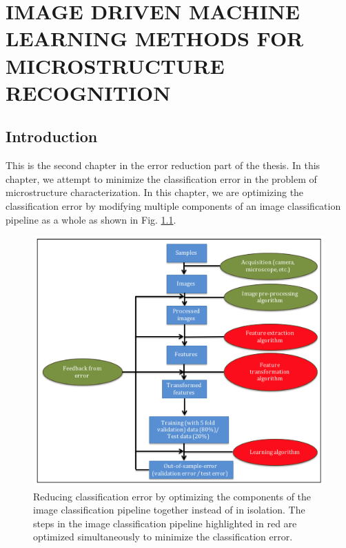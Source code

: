 \chapter{IMAGE DRIVEN MACHINE LEARNING METHODS FOR MICROSTRUCTURE RECOGNITION}
\label{chap:COMMAT}

\let\thefootnote\relax{}



\section{Introduction}
\label{intro}

This is the second chapter in the error reduction part of the thesis. In this chapter, we attempt to minimize the classification error in the problem of microstructure characterization. In this chapter, we are optimizing the classification error by modifying multiple components of an image classification pipeline as a whole as shown in Fig. \ref{fig:chapter3}.

\begin{figure}[ht!]
\centering
\includegraphics[width=1.0\textwidth]{img/chapter3}
\caption{Reducing classification error by optimizing the components of the image classification pipeline together instead of in isolation. The steps in the image classification pipeline highlighted in red are optimized simultaneously to minimize the classification error.}
\label{fig:chapter3}
\end{figure}

